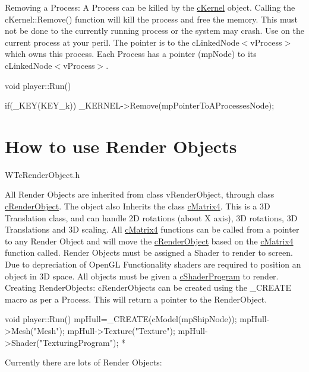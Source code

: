 Removing a Process: A Process can be killed by the \hyperlink{classc_kernel}{cKernel} object. Calling the cKernel::Remove() function will kill the process and free the memory. This must not be done to the currently running process or the system may crash. Use on the current process at your peril. The pointer is to the cLinkedNode$<$vProcess$>$ which owns this process. Each Process has a pointer (mpNode) to its cLinkedNode$<$vProcess$>$. 
\begin{DoxyCode}
 void player::Run()
 {

 if(_KEY(KEY_k)) _KERNEL->Remove(mpPointerToAProcessesNode);

 }
\end{DoxyCode}
 \hypertarget{_using_engine_page_RenderObjectsPage}{}\section{How to use Render Objects}\label{_using_engine_page_RenderObjectsPage}
WTcRenderObject.h

All Render Objects are inherited from class vRenderObject, through class \hyperlink{classc_render_object}{cRenderObject}. The object also Inherits the class \hyperlink{classc_matrix4}{cMatrix4}. This is a 3D Translation class, and can handle 2D rotations (about X axis), 3D rotations, 3D Translations and 3D scaling. All \hyperlink{classc_matrix4}{cMatrix4} functions can be called from a pointer to any Render Object and will move the \hyperlink{classc_render_object}{cRenderObject} based on the \hyperlink{classc_matrix4}{cMatrix4} function called. Render Objects must be assigned a Shader to render to screen. Due to depreciation of OpenGL Functionality shaders are required to position an object in 3D space. All objects must be given a \hyperlink{classc_shader_program}{cShaderProgram} to render. Creating RenderObjects: cRenderObjects can be created using the \_\-CREATE macro as per a Process. This will return a pointer to the RenderObject. 
\begin{DoxyCode}
 void player::Run()
 {
        mpHull=_CREATE(cModel(mpShipNode));
        mpHull->Mesh("Mesh");
        mpHull->Texture("Texture");
        mpHull->Shader("TexturingProgram");
 }
 *
\end{DoxyCode}


Currently there are lots of Render Objects:

